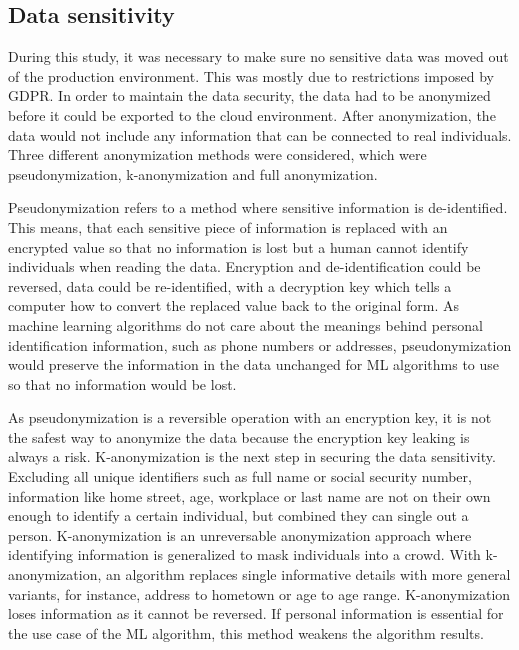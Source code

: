 
\subsection{Data sensitivity}\label{subsec:bg-data-sensitivity}

During this study,
it was necessary to make sure no sensitive data
was moved out of the production environment.
This was mostly due to restrictions imposed by GDPR\@.
In order to maintain the data security,
the data had to be anonymized
before it could be exported to the cloud environment.
After anonymization,
the data would not include any information
that can be connected to real individuals.
Three different anonymization methods were considered,
which were pseudonymization, k-anonymization and full anonymization.

Pseudonymization refers to a method
where sensitive information is de-identified.
This means,
that each sensitive piece of information
is replaced with an encrypted value
so that no information is lost
but a human cannot identify individuals
when reading the data.
Encryption and de-identification
could be reversed, \ie data could be re-identified,
with a decryption key which tells a computer
how to convert the replaced value back to the original form.
As machine learning algorithms do not care about the meanings
behind personal identification information,
such as phone numbers or addresses,
pseudonymization would preserve the information in the data unchanged
for ML algorithms to use so that no information would be lost.~\cite{noumeir2007pseudonymization}

As pseudonymization is a reversible operation with an encryption key,
it is not the safest way to anonymize the data
because the encryption key leaking is always a risk.
K-anonymization is the next step in securing the data sensitivity.
Excluding all unique identifiers such as full name or social security number,
information like home street, age, workplace or last name
are not on their own enough to identify a certain individual,
but combined they can single out a person.
K-anonymization is an unreversable anonymization approach
where identifying information is generalized
to mask individuals into a crowd.
With k-anonymization,
an algorithm replaces single informative details
with more general variants,
for instance,
address to hometown or age to age range.
K-anonymization loses information
as it cannot be reversed.
If personal information is essential for the use case of the ML algorithm,
this method weakens the algorithm results.~\cite{byun2007efficient}

